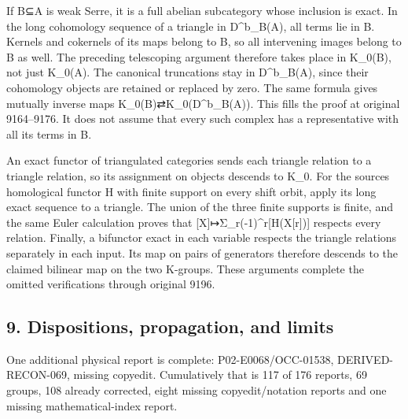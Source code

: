 If B⊆A is weak Serre,\allowbreak{} it is a full abelian subcategory whose inclusion is exact. In the long cohomology sequence of a triangle in D\textasciicircum{}b\_\allowbreak{}B(A)\allowbreak{},\allowbreak{} all terms lie in B. Kernels and cokernels of its maps belong to B,\allowbreak{} so all intervening images belong to B as well. The preceding telescoping argument therefore takes place in K\_\allowbreak{}0(B)\allowbreak{},\allowbreak{} not just K\_\allowbreak{}0(A)\allowbreak{}. The canonical truncations stay in D\textasciicircum{}b\_\allowbreak{}B(A)\allowbreak{},\allowbreak{} since their cohomology objects are retained or replaced by zero. The same formula gives mutually inverse maps K\_\allowbreak{}0(B)\allowbreak{}⇄K\_\allowbreak{}0(D\textasciicircum{}b\_\allowbreak{}B(A)\allowbreak{})\allowbreak{}. This fills the proof at original 9164–\allowbreak{}9176. It does not assume that every such complex has a representative with all its terms in B.

An exact functor of triangulated categories sends each triangle relation to a triangle relation,\allowbreak{} so its assignment on objects descends to K\_\allowbreak{}0. For the source\textquotesingle s homological functor H with finite support on every shift orbit,\allowbreak{} apply its long exact sequence to a triangle. The union of the three finite supports is finite,\allowbreak{} and the same Euler calculation proves that [X]\allowbreak{}\allowbreak{}↦Σ\_\allowbreak{}r(-1)\allowbreak{}\textasciicircum{}r[H(X[r]\allowbreak{})\allowbreak{}]\allowbreak{} respects every relation. Finally,\allowbreak{} a bifunctor exact in each variable respects the triangle relations separately in each input. Its map on pairs of generators therefore descends to the claimed bilinear map on the two K-groups. These arguments complete the omitted verifications through original 9196.

\subsection{\texorpdfstring{9. Dispositions,\allowbreak{} propagation,\allowbreak{} and limits}{9.   and limits}}\label{proofs-8774-9196-dispositions-propagation-and-limits}

One additional physical report is complete:\allowbreak{} P02-E0068/\allowbreak{}OCC-01538,\allowbreak{} DERIVED-RECON-069,\allowbreak{} missing copyedit. Cumulatively that is 117 of 176 reports,\allowbreak{} 69 groups,\allowbreak{} 108 already corrected,\allowbreak{} eight missing copyedit/\allowbreak{}notation reports and one missing mathematical-index report.

